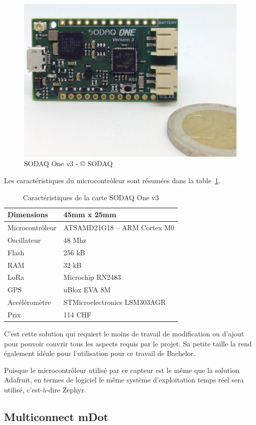 \begin{figure}[htb]
\centering 
\includegraphics[width=0.4\columnwidth]{../images/sodaq-one-eu-rn2483-v3.jpg} 
\caption[SODAQ One]{SODAQ One v3 - © SODAQ}
\label{fig:sodaq_one}
\end{figure}

Les caractéristiques du microcontrôleur sont résumées dans la table~\ref{tab:sodaq_one_cara}.

\begin{table}[htb]
\caption[SODAQ One Caractéristiques]{Caractéristiques de la carte SODAQ One v3}
\label{tab:sodaq_one_cara}
\centering
\begin{tabular}{ l | l }
\toprule
Dimensions & 45mm x 25mm \\
\midrule
Microcontrôleur & ATSAMD21G18 – ARM Cortex M0 \\
\midrule
Oscillateur & 48 Mhz \\
\midrule
Flash & 256 kB \\
\midrule
RAM & 32 kB \\
\midrule
LoRa & Microchip RN2483 \\
\midrule
GPS & uBlox EVA 8M \\
\midrule
Accéléromètre & STMicroelectronics LSM303AGR \\
\midrule
Prix & 114 CHF\\
\bottomrule 
\end{tabular}
\end{table}

C’est cette solution qui requiert le moins de travail de modification ou d’ajout pour pouvoir couvrir tous les aspects requis par le projet. Sa petite taille la rend également idéale pour l’utilisation pour ce travail de Bachelor.

Puisque le microcontrôleur utilisé par ce capteur est le même que la solution Adafruit, en termes de logiciel le même système d’exploitation temps réel sera utilisé, c’est-à-dire Zephyr.

\subsection{Multiconnect mDot}

